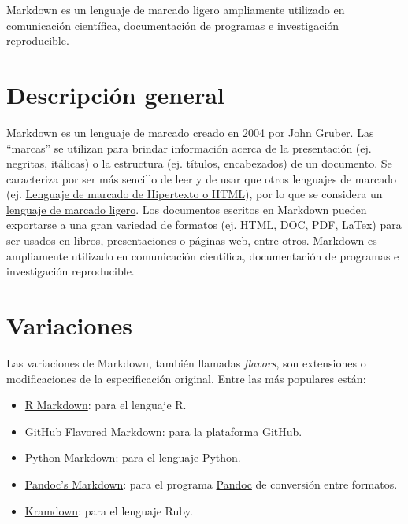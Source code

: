 \documentclass[
  letterpaper,
  DIV=11,
  numbers=noendperiod]{scrreprt}
\providecommand{\tightlist}{%
  \setlength{\itemsep}{0pt}\setlength{\parskip}{0pt}}\usepackage{longtable,booktabs,array}
\begin{document}
Markdown es un lenguaje de marcado ligero ampliamente utilizado en
comunicación científica, documentación de programas e investigación
reproducible.

\hypertarget{descripciuxf3n-general}{%
\section{Descripción general}\label{descripciuxf3n-general}}

\href{https://daringfireball.net/projects/markdown/}{Markdown} es un
\href{https://es.wikipedia.org/wiki/Lenguaje_de_marcado}{lenguaje de
marcado} creado en 2004 por John Gruber. Las ``marcas'' se utilizan para
brindar información acerca de la presentación (ej. negritas, itálicas) o
la estructura (ej. títulos, encabezados) de un documento. Se caracteriza
por ser más sencillo de leer y de usar que otros lenguajes de marcado
(ej. \href{https://es.wikipedia.org/wiki/HTML}{Lenguaje de marcado de
Hipertexto o HTML}), por lo que se considera un
\href{https://es.wikipedia.org/wiki/Lenguaje_de_marcas_ligero}{lenguaje
de marcado ligero}. Los documentos escritos en Markdown pueden
exportarse a una gran variedad de formatos (ej. HTML, DOC, PDF, LaTex)
para ser usados en libros, presentaciones o páginas web, entre otros.
Markdown es ampliamente utilizado en comunicación científica,
documentación de programas e investigación reproducible.

\hypertarget{variaciones}{%
\section{Variaciones}\label{variaciones}}

Las variaciones de Markdown, también llamadas \emph{flavors}, son
extensiones o modificaciones de la especificación original. Entre las
más populares están:

\begin{itemize}
\tightlist
\item
  \href{https://rmarkdown.rstudio.com/}{R Markdown}: para el lenguaje R.
\item
  \href{https://help.github.com/en/github/writing-on-github}{GitHub
  Flavored Markdown}: para la plataforma GitHub.
\item
  \href{https://github.com/Python-Markdown/markdown}{Python Markdown}:
  para el lenguaje Python.
\item
  \href{https://pandoc.org/MANUAL.html\#pandocs-markdown}{Pandoc's
  Markdown}: para el programa \href{https://pandoc.org/}{Pandoc} de
  conversión entre formatos.
\item
  \href{https://kramdown.gettalong.org/quickref.html}{Kramdown}: para el
  lenguaje Ruby.
\end{itemize}
\end{document}
